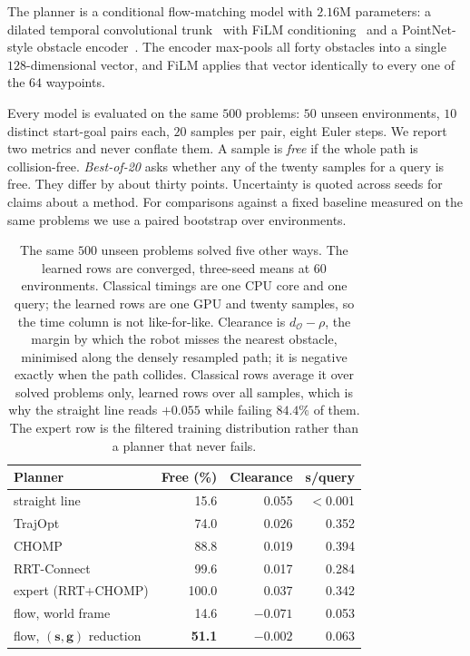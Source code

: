 \documentclass[10pt,twocolumn,letterpaper]{article}
\newcommand{\toprule}{\hline}
\newcommand{\midrule}{\hline}
\newcommand{\bottomrule}{\hline}}
\newcommand{\svec}{\mathbf{s}}
\newcommand{\gvec}{\mathbf{g}}
\begin{document}
The planner is a conditional flow-matching model with $2.16$M parameters: a
dilated temporal convolutional trunk~\cite{oord2016wavenet} with FiLM
conditioning~\cite{perez2018film}
and a PointNet-style obstacle encoder~\cite{qi2017pointnet}. The encoder
max-pools all forty obstacles into a single $128$-dimensional vector, and FiLM
applies that vector identically to every one of the $64$ waypoints.

Every model is evaluated on the same $500$ problems: $50$ unseen environments,
$10$ distinct start-goal pairs each, $20$ samples per pair, eight Euler steps. We
report two metrics and never conflate them. A sample is \emph{free} if the whole
path is collision-free. \emph{Best-of-20} asks whether any of the twenty samples
for a query is free. They differ by about thirty points. Uncertainty is quoted
across seeds for claims about a method. For comparisons against a fixed baseline
measured on the same problems we use a paired bootstrap over environments.

\begin{table}[t]
\centering
\footnotesize
\setlength{\tabcolsep}{3.5pt}
\begin{tabular}{@{}lrrr@{}}
\toprule
Planner & Free (\%) & Clearance & s/query \\
\midrule
straight line                   & 15.6 & 0.055 & $<$0.001 \\
TrajOpt                         & 74.0 & 0.026 & 0.352 \\
CHOMP                           & 88.8 & 0.019 & 0.394 \\
RRT-Connect                     & 99.6 & 0.017 & 0.284 \\
expert (RRT+CHOMP)              & 100.0 & 0.037 & 0.342 \\
\midrule
flow, world frame               & 14.6 & $-0.071$ & 0.053 \\
flow, $(\svec,\gvec)$ reduction & \textbf{51.1} & $-0.002$ & 0.063 \\
\bottomrule
\end{tabular}
\caption{The same $500$ unseen problems solved five other ways. The learned rows
are converged, three-seed means at $60$ environments. Classical timings are one
CPU core and one query; the learned rows are one GPU and twenty samples, so the
time column is not like-for-like. Clearance is $d_{\mathcal{O}} - \rho$, the
margin by which the robot misses the nearest obstacle, minimised along the
densely resampled path; it is negative exactly when the path collides. Classical
rows average it over solved problems only, learned rows over all samples, which
is why the straight line reads $+0.055$ while failing $84.4\%$ of them. The
expert row is the filtered training distribution rather than a planner that never
fails.}
\label{tab:floors}
\end{table}
\end{document}
